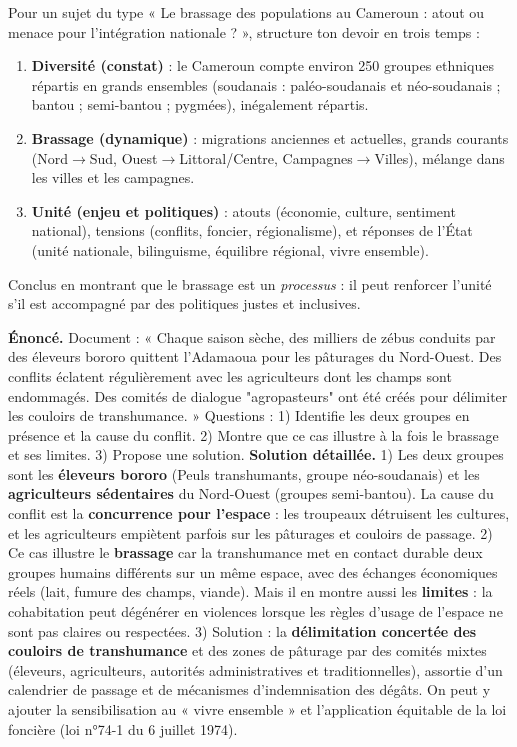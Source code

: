\documentclass[11pt]{article}
\begin{document}
\begin{methode}
Pour un sujet du type « Le brassage des populations au Cameroun : atout ou menace pour l'intégration nationale ? », structure ton devoir en trois temps :
\begin{enumerate}
\item \textbf{Diversité (constat)} : le Cameroun compte environ 250 groupes ethniques répartis en grands ensembles (soudanais : paléo-soudanais et néo-soudanais ; bantou ; semi-bantou ; pygmées), inégalement répartis.
\item \textbf{Brassage (dynamique)} : migrations anciennes et actuelles, grands courants (Nord$\rightarrow$Sud, Ouest$\rightarrow$Littoral/Centre, Campagnes$\rightarrow$Villes), mélange dans les villes et les campagnes.
\item \textbf{Unité (enjeu et politiques)} : atouts (économie, culture, sentiment national), tensions (conflits, foncier, régionalisme), et réponses de l'État (unité nationale, bilinguisme, équilibre régional, vivre ensemble).
\end{enumerate}
Conclus en montrant que le brassage est un \emph{processus} : il peut renforcer l'unité s'il est accompagné par des politiques justes et inclusives.
\end{methode}

\begin{exoresolu}
\textbf{Énoncé.} Document : « Chaque saison sèche, des milliers de zébus conduits par des éleveurs bororo quittent l'Adamaoua pour les pâturages du Nord-Ouest. Des conflits éclatent régulièrement avec les agriculteurs dont les champs sont endommagés. Des comités de dialogue "agropasteurs" ont été créés pour délimiter les couloirs de transhumance. » Questions : 1) Identifie les deux groupes en présence et la cause du conflit. 2) Montre que ce cas illustre à la fois le brassage et ses limites. 3) Propose une solution.
\tcblower
\textbf{Solution détaillée.}
1) Les deux groupes sont les \textbf{éleveurs bororo} (Peuls transhumants, groupe néo-soudanais) et les \textbf{agriculteurs sédentaires} du Nord-Ouest (groupes semi-bantou). La cause du conflit est la \textbf{concurrence pour l'espace} : les troupeaux détruisent les cultures, et les agriculteurs empiètent parfois sur les pâturages et couloirs de passage.
2) Ce cas illustre le \textbf{brassage} car la transhumance met en contact durable deux groupes humains différents sur un même espace, avec des échanges économiques réels (lait, fumure des champs, viande). Mais il en montre aussi les \textbf{limites} : la cohabitation peut dégénérer en violences lorsque les règles d'usage de l'espace ne sont pas claires ou respectées.
3) Solution : la \textbf{délimitation concertée des couloirs de transhumance} et des zones de pâturage par des comités mixtes (éleveurs, agriculteurs, autorités administratives et traditionnelles), assortie d'un calendrier de passage et de mécanismes d'indemnisation des dégâts. On peut y ajouter la sensibilisation au « vivre ensemble » et l'application équitable de la loi foncière (loi n°74-1 du 6 juillet 1974).
\end{exoresolu}
\end{document}
